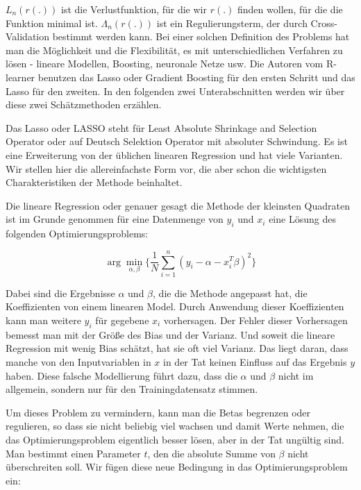 \documentclass[12pt,a4paper,twoside]{scrartcl}
\numberwithin{equation}{section}
\newcounter{subsubsubsection}[subsubsection]
\begin{document}
\noindent
$L_n(r(.))$ ist die Verlustfunktion, für die wir $r(.)$ finden wollen, für die die Funktion minimal ist. $\Lambda_n(r(.))$ ist ein Regulierungsterm, der durch Cross-Validation bestimmt werden kann. Bei einer solchen Definition des Problems hat man die Möglichkeit und die Flexibilität, es mit unterschiedlichen Verfahren zu lösen - lineare Modellen, Boosting, neuronale Netze usw. Die Autoren vom R-learner benutzen das Lasso oder Gradient Boosting für den ersten Schritt und das Lasso für den zweiten. In den folgenden zwei Unterabschnitten werden wir über diese zwei Schätzmethoden erzählen.\par

\label{subsubsubsec:lasso}
	Das Lasso oder LASSO steht für Least Absolute Shrinkage and Selection Operator oder auf Deutsch Selektion Operator mit absoluter Schwindung. Es ist eine Erweiterung von der üblichen linearen Regression und hat viele Varianten. Wir stellen hier die allereinfachste Form vor, die aber schon die wichtigsten Charakteristiken der Methode beinhaltet.\par 
	
\noindent
Die lineare Regression oder genauer gesagt die Methode der kleinsten Quadraten ist im Grunde genommen für eine Datenmenge von  $y_i$ und $x_i$ eine Lösung des folgenden Optimierungsproblems:\par	

\begin{equation}\label{eq:2.22}
	 \arg\min_{\alpha, \beta} \bigg\{ \frac{1}{N}\sum_{i=1}^{n} (y_i - \alpha - x_i^T\beta)^2 \bigg\}
\end{equation}

\noindent
Dabei sind die Ergebnisse $\alpha$ und $\beta$, die die Methode angepasst hat, die Koeffizienten von einem linearen Model. Durch Anwendung dieser Koeffizienten kann man weitere $y_i$ für gegebene $x_i$ vorhersagen. Der Fehler dieser Vorhersagen bemesst man mit der Größe des Bias und der Varianz. Und soweit die lineare Regression mit wenig Bias schätzt, hat sie oft viel Varianz. Das liegt daran, dass manche von den Inputvariablen in $x$ in der Tat keinen Einfluss auf das Ergebnis $y$ haben. Diese falsche Modellierung führt dazu, dass die $\alpha$ und $\beta$ nicht im allgemein, sondern nur für den Trainingdatensatz stimmen.\par 

\noindent
Um dieses Problem zu vermindern, kann man die Betas begrenzen oder regulieren, so dass sie nicht beliebig viel wachsen und damit Werte nehmen, die das Optimierungsproblem eigentlich besser lösen, aber in der Tat ungültig sind. Man bestimmt einen Parameter $t$, den die absolute Summe von $\beta$ nicht überschreiten soll\cite{tibshirani1996regression}. Wir fügen diese neue Bedingung in das Optimierungsproblem ein:\par   
\end{document}
